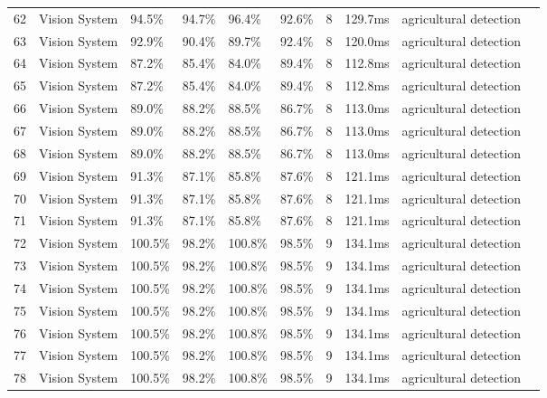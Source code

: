 \begin{table*}[htbp]
\begin{tabular}{p{}p{}p{}p{}p{}p{}p{}p{}p{}p{}}
 62 & Vision System & 94.5\% & 94.7\% & 96.4\% & 92.6\% & 8 & 129.7ms & agricultural detection & \cite{Zhang2017} \\
 63 & Vision System & 92.9\% & 90.4\% & 89.7\% & 92.4\% & 8 & 120.0ms & agricultural detection & \cite{Kim2016} \\
 64 & Vision System & 87.2\% & 85.4\% & 84.0\% & 89.4\% & 8 & 112.8ms & agricultural detection & \cite{Wang2015} \\
 65 & Vision System & 87.2\% & 85.4\% & 84.0\% & 89.4\% & 8 & 112.8ms & agricultural detection & \cite{Li2015} \\
 66 & Vision System & 89.0\% & 88.2\% & 88.5\% & 86.7\% & 8 & 113.0ms & agricultural detection & \cite{Chen2014} \\
 67 & Vision System & 89.0\% & 88.2\% & 88.5\% & 86.7\% & 8 & 113.0ms & agricultural detection & \cite{Zhang2014} \\
 68 & Vision System & 89.0\% & 88.2\% & 88.5\% & 86.7\% & 8 & 113.0ms & agricultural detection & \cite{Kim2014} \\
 69 & Vision System & 91.3\% & 87.1\% & 85.8\% & 87.6\% & 8 & 121.1ms & agricultural detection & \cite{Wang2013} \\
 70 & Vision System & 91.3\% & 87.1\% & 85.8\% & 87.6\% & 8 & 121.1ms & agricultural detection & \cite{Yeo2013} \\
 71 & Vision System & 91.3\% & 87.1\% & 85.8\% & 87.6\% & 8 & 121.1ms & agricultural detection & \cite{Zhang2013} \\
 72 & Vision System & 100.5\% & 98.2\% & 100.8\% & 98.5\% & 9 & 134.1ms & agricultural detection & \cite{Zhang2022} \\
 73 & Vision System & 100.5\% & 98.2\% & 100.8\% & 98.5\% & 9 & 134.1ms & agricultural detection & \cite{Wang2022} \\
 74 & Vision System & 100.5\% & 98.2\% & 100.8\% & 98.5\% & 9 & 134.1ms & agricultural detection & \cite{Song2022} \\
 75 & Vision System & 100.5\% & 98.2\% & 100.8\% & 98.5\% & 9 & 134.1ms & agricultural detection & \cite{Shi2022} \\
 76 & Vision System & 100.5\% & 98.2\% & 100.8\% & 98.5\% & 9 & 134.1ms & agricultural detection & \cite{Rao2022} \\
 77 & Vision System & 100.5\% & 98.2\% & 100.8\% & 98.5\% & 9 & 134.1ms & agricultural detection & \cite{Qi2022} \\
 78 & Vision System & 100.5\% & 98.2\% & 100.8\% & 98.5\% & 9 & 134.1ms & agricultural detection & \cite{Ou2022} \\

\end{tabular}
\end{table*}
